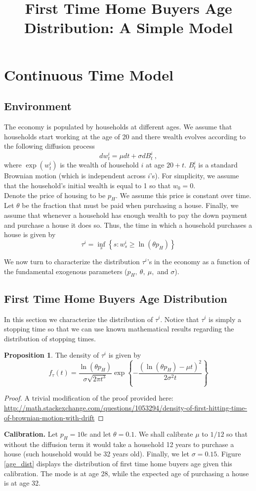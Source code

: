 \documentclass[11pt]{article}
\title{First Time Home Buyers Age Distribution: A Simple Model}
\date{ }
\theoremstyle{definition} %
\newtheorem{prop}{Proposition}
\begin{document}
\maketitle


\section{Continuous Time Model}
\subsection{Environment}
The economy is populated by households at different ages. We assume that households start working at the age of 20 and there wealth evolves according to the following diffusion process
\[
dw_t^i = \mu dt + \sigma dB_t^i ~,
\]
where $\exp(w_t^i)$ is the wealth of household $i$ at age $20+t$. $B_t^i$ is a standard Brownian motion (which is independent across $i$'s). For simplicity, we assume that the household's initial wealth is equal to 1 so that $w_0 = 0$.\\
Denote the price of housing to be $p_H$. We assume this price is constant over time. Let $\theta$ be the fraction that must be paid when purchasing a house. Finally, we assume that whenever a household has enough wealth to pay the down payment and purchase a house it does so. Thus, the time in which a household purchases a house is given by
\[
\tau^i = \inf_s \left\{s: w^i_s\geq \ln \left(\theta p_H\right) \right\}
\]

We now turn to characterize the distribution $\tau^i$'s in the economy as a function of the fundamental exogenous parameters ($p_H,~ \theta,~ \mu,$ and $\sigma$).
\subsection{First Time Home Buyers Age Distribution}
In this section we characterize the distribution of $\tau^i$. Notice that $\tau^i$ is simply a stopping time so that we can use known mathematical results regarding the distribution of stopping times.
\begin{prop}
The density of $\tau^i$ is given by
\[
f_\tau (t) = \frac{\ln (\theta p_H)}{\sigma \sqrt{2\pi t^3}} \exp \left\{ -\frac{(\ln (\theta p_H) - \mu t)^2}{2\sigma^2 t} \right\}
\]
\end{prop}
\begin{proof}
A trivial modification of the proof provided here: \url{http://math.stackexchange.com/questions/1053294/density-of-first-hitting-time-of-brownian-motion-with-drift}
\end{proof}
\textbf{Calibration.} Let $p_H = 10e$ and let $\theta = 0.1$. We shall calibrate $\mu$ to $1/12$ so that without the diffusion term it would take a household 12 years to purchase a house (such household would be 32 years old). Finally, we let $\sigma = 0.15$. Figure \ref{age_dist} displays the distribution of first time home buyers age given this calibration. The mode is at age 28, while the expected age of purchasing a house is at age 32.
\end{document}
